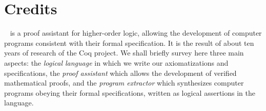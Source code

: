 \chapter*{Credits}

\Coq{}~ is a proof assistant for higher-order logic, allowing the
development of computer programs consistent with their formal
specification.  It is the result of about ten years of research of the
Coq project.  We shall briefly survey here three main aspects: the
\emph{logical language} in which we write our axiomatizations and
specifications, the \emph{proof assistant} which allows the development
of verified mathematical proofs, and the \emph{program extractor} which
synthesizes computer programs obeying their formal specifications,
written as logical assertions in the language.

